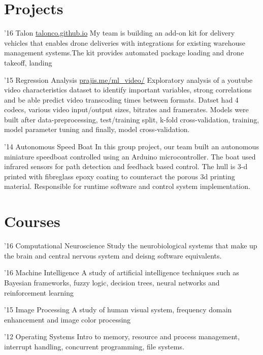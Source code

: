 \documentclass{tccv}
\begin{document}
\section{Projects}

\begin{yearlist}

\item{'16}
  {Talon \href{http://talonco.github.io}{talonco.github.io}}
      {My team is building an add-on kit for delivery vehicles that enables drone deliveries with integrations for existing warehouse management systems.The kit provides automated package loading and drone takeoff, landing}

      \item{'15}
        {Regression Analysis \href{http://prajis.me/ml\_video}{prajis.me/ml\_video/}}
        {Exploratory analysis of a youtube video characteristics dataset to identify important variables, strong correlations and be able predict video transcoding times between formats. Datset had 4 codecs, various video input/output sizes, bitrates and framerates. Models were built after data-preprocessing, test/training split, k-fold cross-validation, training, model parameter tuning and finally, model cross-validation.}
        
     \item{'14}
         {Autonomous Speed Boat}
         {In this group project, our team built an autonomous miniature speedboat controlled using an Arduino microcontroller. The boat used infrared sensors for path detection and feedback based control. The hull is 3-d printed with fibreglass epoxy coating to counteract the porous 3d printing material. Responsible for runtime software and control system implementation.} 

\end{yearlist}

\section{Courses}

\begin{yearlist}

\item{'16}
     {Computational Neuroscience}
     {Study the neurobiological systems that make up the brain and central nervous system and deisng software equivalents.}

\item{'16}
     {Machine Intelligence}
     {A study of artificial intelligence techniques such as Bayesian frameworks, fuzzy logic, decision trees, neural networks and reinforcement learning}

\item{'15}
     {Image Processing}
     {A study of human visual system, frequency domain enhancement and image color processing}
   \item{'12}
     {Operating Systems}
     {Intro to memory, resource and process management, interrupt handling, concurrent programming, file systems.}



\end{yearlist}
\end{document}

